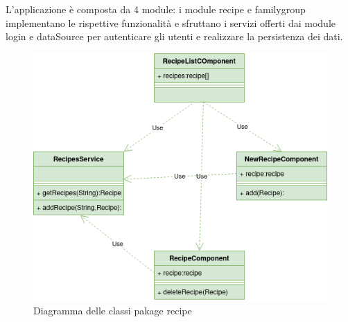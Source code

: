 L'applicazione è composta da 4 module: i module recipe e familygroup implementano le rispettive funzionalità e sfruttano i servizi offerti dai module login e dataSource per autenticare gli utenti e realizzare la persistenza dei dati.
\begin{figure}[H]
    \centering
 \includegraphics[scale=0.7]{resources/diagramma_package-recipe.drawio.png}
   \caption{Diagramma delle classi pakage recipe}
\end{figure}

